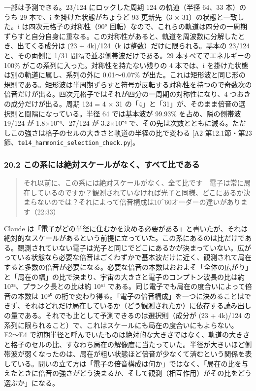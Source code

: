 \documentclass[
  a4paper,
]{ltjsarticle}
\begin{document}
一部は予測できる。23/124 にロックした周期 124 の軌道（半径 64、33
本）のうち 29 本で、i を掛けた状態がちょうど 93 更新先（3 ×
31）の状態と一致した。i は四次元格子の対称性（90°
回転）なので、これらの軌道は四分の一周期ずらすと自分自身に重なる。この対称性があると、軌道を周波数に分解したとき、出てくる成分は
(23 + 4k)/124（k は整数）だけに限られる。基本の 23/124 と、その両側に
1/31 間隔で並ぶ側帯波だけである。29 本すべてでエネルギーの 100\%
がこの系列に入った。対称性を持たない残りの 4 本では、i
を掛けた状態は別の軌道に属し、系列の外に 0.01〜0.07\%
が出た。これは矩形波と同じ形の規則である。矩形波は半周期ずらすと符号が反転する対称性を持つので奇数次の倍音だけが出る。四次元格子ではそれが四分の一周期の対称性になり、4
つおきの成分だけが出る。周期 124 = 4 × 31
の「4」と「31」が、そのまま倍音の選択則と間隔になっている。半径 64
では基本波が 99.93\% を占め、隣の側帯波 19/124 が 1.8×10⁻⁴、27/124 が
3.2×10⁻⁴
で、その先は次数とともに減る。ただしこの強さは格子のセルの大きさと軌道の半径の比で変わる
{[}A2
第12.1節・第23節、\texttt{te14\_\allowbreak{}harmonic\_\allowbreak{}selection\_\allowbreak{}check.py}{]}。

\subsubsection{20.2
この系には絶対スケールがなく、すべて比である}\label{ux3053ux306eux7cfbux306bux306fux7d76ux5bfeux30b9ux30b1ux30fcux30ebux304cux306aux304fux3059ux3079ux3066ux6bd4ux3067ux3042ux308b}

\begin{quote}
それ以前に、この系には絶対スケールがなく、全て比です　電子は常に局在しているのですか？観測されていなければ光子と同様、どこにあるか決まらないのでは？それによって倍音構成は10\^{}60オーダーの違いがあります（22:33）
\end{quote}

Claude
は「電子がどの半径に住むかを決める必要がある」と書いたが、それは絶対的なスケールがあるという前提に立っていた。この系にあるのは比だけである。観測されていない電子は光子と同じでどこにあるかが決まっていない。広がっている状態なら必要な倍音はごくわずかで基本波だけに近く、観測されて局在すると多数の倍音が必要になる。必要な倍音の本数はおおよそ「全体の広がり」と「局在の幅」の比で決まり、宇宙の大きさと電子のコンプトン波長の比は約
10³⁸、プランク長との比は約 10⁶¹
である。同じ電子でも局在の度合いによって倍音の本数は 10⁶⁰
の桁で変わり得る。「電子の倍音構成」を一つに決めることはできず、それはどれだけ局在しているか（どう観測されたか）に依存する読み出しの量である。それでも比として予測できるのは選択則（成分が
(23 + 4k)/124
の系列に限られること）で、これはスケールにも局在の度合いにもよらない。E2〜E4
で初期半径と呼んでいたものは絶対的な大きさではなく、軌道の大きさと格子のセルの比、すなわち局在の解像度に当たっていた。半径が大きいほど側帯波が弱くなったのは、局在が粗い状態ほど倍音が少なくて済むという関係を表している。問いの立て方は「電子の倍音構成は何か」ではなく、「局在の比を与えたときに倍音の強さがどう決まるか、そして観測（相互作用）がその比をどう選ぶか」になる。
\end{document}
